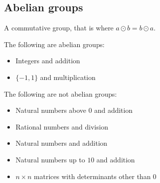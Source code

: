 
\subsection{Abelian groups}

A commutative group, that is where \(a\odot b=b\odot a\).

The following are abelian groups:

\begin{itemize}
\item Integers and addition
\item \(\{-1, 1\}\) and multiplication
\end{itemize}

The following are not abelian groups:

\begin{itemize}
\item Natural numbers above \(0\) and addition
\item Rational numbers and division
\item Natural numbers and addition
\item Natural numbers up to \(10\) and addition
\item \(n\times n\) matrices with determinants other than \(0\)
\end{itemize}

